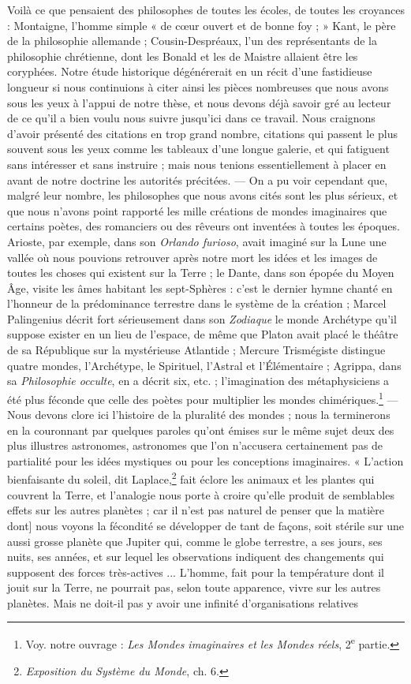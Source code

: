 \documentclass[a4paper, 11pt, oneside]{article}
\begin{document}
Voilà ce que pensaient des philosophes de toutes les écoles, de toutes les croyances : Montaigne, l'homme simple « de cœur ouvert et de bonne foy ; » Kant, le père de la philosophie allemande ; Cousin-Despréaux, l'un des représentants de la philosophie chrétienne, dont les Bonald et les de Maistre allaient être les coryphées. Notre étude historique dégénérerait en un récit d'une fastidieuse longueur si nous continuions à citer ainsi les pièces nombreuses que nous avons sous les yeux à l'appui de notre thèse, et nous devons déjà savoir gré au lecteur de ce qu'il a bien voulu nous suivre jusqu'ici dans ce travail. Nous craignons d'avoir présenté des citations en trop grand nombre, citations qui passent le plus souvent sous les yeux comme les tableaux d'une longue galerie, et qui fatiguent sans intéresser et sans instruire ; mais nous tenions essentiellement à placer en avant de notre doctrine les autorités précitées. --- On a pu voir cependant que, malgré leur nombre, les philosophes que nous avons cités sont les plus sérieux, et que nous n'avons point rapporté les mille créations de mondes imaginaires que certains poètes, des romanciers ou des rêveurs ont inventées à toutes les époques. Arioste, par exemple, dans son \emph{Orlando furioso}, avait imaginé sur la Lune une vallée où nous pouvions retrouver après notre mort les idées et les images de toutes les choses qui existent sur la Terre ; le Dante, dans son épopée du Moyen Âge, visite les âmes habitant les sept-Sphères : c'est le dernier hymne chanté en l'honneur de la prédominance terrestre dans le système de la création ; Marcel Palingenius décrit fort sérieusement dans son \emph{Zodiaque} le monde Archétype qu'il suppose exister en un lieu de l'espace, de même que Platon avait placé le théâtre de sa République sur la mystérieuse Atlantide ; Mercure Trismégiste distingue quatre mondes, l'Archétype, le Spirituel, l'Astral et l'Élémentaire ; Agrippa, dans sa \emph{Philosophie occulte}, en a décrit six, etc. ; l'imagination des métaphysiciens a été plus féconde que celle des poètes pour multiplier les mondes chimériques.\footnote{Voy. notre ouvrage : \emph{Les Mondes imaginaires et les Mondes réels}, 2\textsuperscript{e} partie.} --- Nous devons clore ici l'histoire de la pluralité des mondes ; nous la terminerons en la couronnant par quelques paroles qu'ont émises sur le même sujet deux des plus illustres astronomes, astronomes que l'on n'accusera certainement pas de partialité pour les idées mystiques ou pour les conceptions imaginaires. « L'action bienfaisante du soleil, dit Laplace,\footnote{\emph{Exposition du Système du Monde}, ch. 6.} fait éclore les animaux et les plantes qui couvrent la Terre, et l'analogie nous porte à croire qu'elle produit de semblables effets sur les autres planètes ; car il n'est pas naturel de penser que la matière dont] nous voyons la fécondité se développer de tant de façons, soit stérile sur une aussi grosse planète que Jupiter qui, comme le globe terrestre, a ses jours, ses nuits, ses années, et sur lequel les observations indiquent des changements qui supposent des forces très-actives ... L'homme, fait pour la température dont il jouit sur la Terre, ne pourrait pas, selon toute apparence, vivre sur les autres planètes. Mais ne doit-il pas y avoir une infinité d'organisations relatives 
\end{document}
